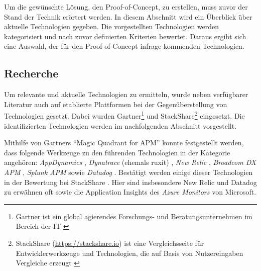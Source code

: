 
%
%

Um die gewünschte Lösung, den Proof-of-Concept, zu erstellen, muss zuvor der Stand der Technik erörtert werden. In diesem Abschnitt wird ein Überblick über aktuelle Technologien gegeben. Die vorgestellten Technologien werden kategorisiert und nach zuvor definierten Kriterien bewertet. Daraus ergibt sich eine Auswahl, der für den Proof-of-Concept infrage kommenden Technologien.

\subsection{Recherche}

Um relevante und aktuelle Technologien zu ermitteln, wurde neben verfügbarer Literatur auch auf etablierte Plattformen bei der Gegenüberstellung von Technologien gesetzt. Dabei wurden Gartner\footnote{Gartner ist ein global agierendes Forschungs- und Beratungsunternehmen im Bereich der IT \cite{GartnerDefinition}} und StackShare\footnote{StackShare (\url{https://stackshare.io}) ist eine Vergleichsseite für Entwicklerwerkzeuge und Technologien, die auf Basis von Nutzereingaben Vergleiche erzeugt \cite{StackshareDefinition}} eingesetzt. Die identifizierten Technologien werden im nachfolgenden Abschnitt vorgestellt. 

Mithilfe von Gartners \enquote{Magic Quadrant for APM} \cite{GartnerMagicQuadrantForAPM} konnte festgestellt werden, dass folgende Werkzeuge zu den führenden Technologien in der Kategorie angehören: \textit{AppDynamics} \cite{AppDynamics}, \textit{Dynatrace} (ehemals ruxit) \cite{Dynatrace}, \textit{New Relic} \cite{NewRelic}, \textit{Broadcom DX APM} \cite{BroadcomDXAPM}, \textit{Splunk APM} \cite{SplunkAPM} sowie \textit{Datadog} \cite{Datadog}. Bestätigt werden einige dieser Technologien in der Bewertung bei StackShare \cite{StackShareAPM}. Hier sind insbesondere New Relic und Datadog zu erwähnen oft sowie  die Application Insights \cite{AzureApplicationInsights} des \textit{Azure Monitors} von Microsoft.


